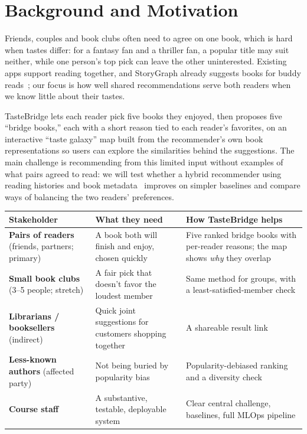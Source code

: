 \section*{Background and Motivation}

Friends, couples and book clubs often need to agree on one book, which is hard when tastes differ: for a fantasy fan and a thriller fan, a popular title may suit neither, while one person's top pick can leave the other uninterested. Existing apps support reading together, and StoryGraph already suggests books for buddy reads~\cite{storygraph}; our focus is how well shared recommendations serve both readers when we know little about their tastes.

TasteBridge lets each reader pick five books they enjoyed, then proposes five ``bridge books,'' each with a short reason tied to each reader's favorites, on an interactive ``taste galaxy'' map built from the recommender's own book representations so users can explore the similarities behind the suggestions. The main challenge is recommending from this limited input without examples of what pairs agreed to read: we will test whether a hybrid recommender using reading histories and book metadata~\cite{kula2015} improves on simpler baselines and compare ways of balancing the two readers' preferences.

\begin{table}[H]
\centering\tablestyle
\begin{tabularx}{\linewidth}{@{}L{5.3cm}L{6.1cm}Y@{}}
\toprule
\textbf{Stakeholder} & \textbf{What they need} & \textbf{How TasteBridge helps} \\
\midrule
\textbf{Pairs of readers} (friends, partners; primary) & A book both will finish and enjoy, chosen quickly & Five ranked bridge books with per-reader reasons; the map shows \emph{why} they overlap \\
\textbf{Small book clubs} (3--5 people; stretch) & A fair pick that doesn't favor the loudest member & Same method for groups, with a least-satisfied-member check \\
\textbf{Librarians / booksellers} (indirect) & Quick joint suggestions for customers shopping together & A shareable result link \\
\textbf{Less-known authors} (affected party) & Not being buried by popularity bias & Popularity-debiased ranking and a diversity check \\
\textbf{Course staff} & A substantive, testable, deployable system & Clear central challenge, baselines, full MLOps pipeline \\
\bottomrule
\end{tabularx}
\end{table}
